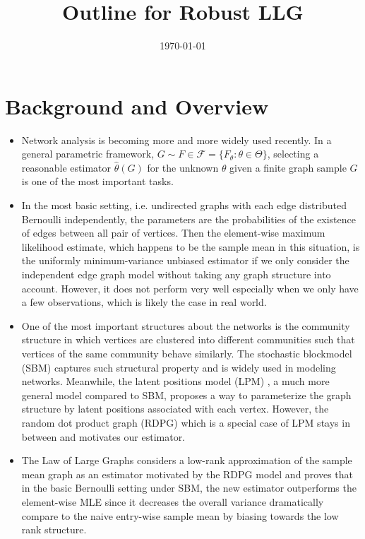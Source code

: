 \documentclass[a4paper]{article}
\title{Outline for Robust LLG}
\date{\today}
\begin{document}
\maketitle

\section{Background and Overview}

\begin{itemize}

\item Network analysis is becoming more and more widely used recently. In a general parametric framework, $G \sim F \in \mathcal{F} = \{F_{\theta} : \theta \in \Theta \}$, selecting a reasonable estimator $\hat{\theta}(G)$ for the unknown $\theta$ given a finite graph sample $G$ is one of the most important tasks.

\item In the most basic setting, i.e. undirected graphs with each edge distributed Bernoulli independently, the parameters are the probabilities of the existence of edges between all pair of vertices.
Then the element-wise maximum likelihood estimate, which happens to be the sample mean in this situation, is the uniformly minimum-variance unbiased estimator if we only consider the independent edge graph model \cite{bollobas2007phase} without taking any graph structure into account. However, it does not perform very well especially when we only have a few observations, which is likely the case in real world.

\item One of the most important structures about the networks is the community structure in which vertices are clustered into different communities such that vertices of the same community behave similarly. The stochastic blockmodel (SBM) \cite{holland1983stochastic} captures such structural property and is widely used in modeling networks.
Meanwhile, the latent positions model (LPM) \cite{hoff2002latent}, a much more general model compared to SBM, proposes a way to parameterize the graph structure by latent positions associated with each vertex. However, the random dot product graph (RDPG) \cite{young2007random, nickel2007random} which is a special case of LPM stays in between and motivates our estimator.

\item The Law of Large Graphs \cite{tang2016law} considers a low-rank approximation of the sample mean graph as an estimator motivated by the RDPG model and proves that in the basic Bernoulli setting under SBM, the new estimator outperforms the element-wise MLE since it decreases the overall variance dramatically compare to the naive entry-wise sample mean by biasing towards the low rank structure. 


\end{itemize}
\end{document}

